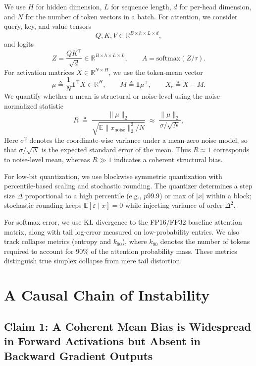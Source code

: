 We use $H$ for hidden dimension, $L$ for sequence length, $d$ for per-head dimension, and $N$ for the number of token vectors in a batch. For attention, we consider query, key, and value tensors
\[
Q,K,V \in \mathbb{R}^{B\times h \times L \times d},
\]
and logits
\[
Z = \frac{QK^\top}{\sqrt{d}} \in \mathbb{R}^{B\times h \times L \times L},
\qquad
A = \mathrm{softmax}(Z/\tau).
\]
For activation matrices $X\in\mathbb{R}^{N\times H}$, we use the token-mean vector
\[
\mu \triangleq \frac{1}{N}\mathbf{1}^\top X \in \mathbb{R}^{H},
\qquad
M \triangleq \mathbf{1}\mu^\top,
\qquad
X_c \triangleq X - M.
\]
We quantify whether a mean is structural or noise-level using the noise-normalized statistic
\[
R \;\triangleq\;
\frac{\|\mu\|_2}
{\sqrt{\mathbb{E}\|x_{\mathrm{noise}}\|_2^2 / N}}
\;\approx\;
\frac{\|\mu\|_2}{\sigma / \sqrt{N}},
\]
Here $\sigma^2$ denotes the coordinate-wise variance under a mean-zero noise model,
so that $\sigma / \sqrt{N}$ is the expected standard error of the mean.
Thus $R \approx 1$ corresponds to noise-level mean,
whereas $R \gg 1$ indicates a coherent structural bias.

For low-bit quantization, we use blockwise symmetric quantization with percentile-based scaling and stochastic rounding. The quantizer determines a step size $\Delta$ proportional to a high percentile (e.g., $p99.9$) or max of $|x|$ within a block; stochastic rounding keeps $\mathbb{E}[\varepsilon\mid x]=0$ while injecting variance of order $\Delta^2$.

For softmax error, we use KL divergence to the FP16/FP32 baseline attention matrix, along with tail log-error measured on low-probability entries. We also track collapse metrics (entropy and $k_{90}$), 
where $k_{90}$ denotes the number of tokens required to account for
$90\%$ of the attention probability mass.
These metrics distinguish true simplex collapse from mere tail distortion.

\section{A Causal Chain of Instability}

\subsection{Claim 1: A Coherent Mean Bias is Widespread in Forward Activations but Absent in Backward Gradient Outputs}

